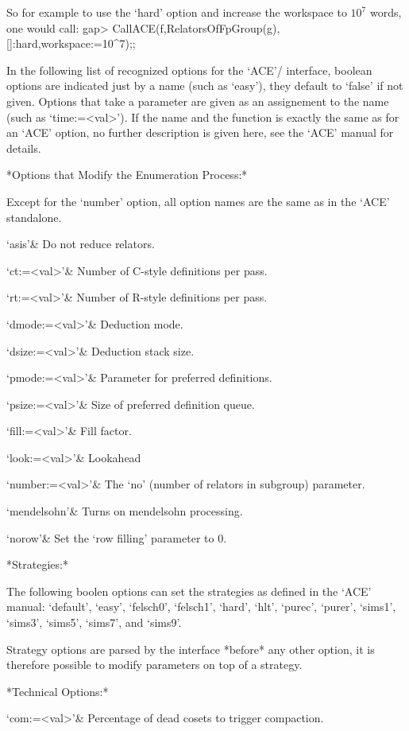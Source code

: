 So for example to use the `hard' option and increase the workspace to $10^7$
words, one would call:
\begintt
gap> CallACE(f,RelatorsOfFpGroup(g),[]:hard,workspace:=10^7);;
\endtt

In the following list of recognized options for
the `ACE'/{\GAP} interface, boolean options are indicated just by a name
(such as `easy'), they default to `false' if not given. Options that take a
parameter are given as an assignement to the name (such as `time:=<val>').
If the name and the function is exactly the same as for an `ACE' option, no
further description is given here, see the `ACE' manual for details.

*Options that Modify the Enumeration Process:*

Except for the `number' option, all option names are the same as in the
`ACE' standalone.

\beginitems
`asis'&
Do not reduce relators.

`ct:=<val>'&
Number of C-style definitions per pass.

`rt:=<val>'&
Number of R-style definitions per pass.

`dmode:=<val>'&
Deduction mode.

`dsize:=<val>'&
Deduction stack size.

`pmode:=<val>'&
Parameter for preferred definitions.

`psize:=<val>'&
Size of preferred definition queue.

`fill:=<val>'&
Fill factor.

`look:=<val>'&
Lookahead

`number:=<val>'&
The `no' (number of relators in subgroup) parameter.

`mendelsohn'&
Turns on mendelsohn processing.

`norow'&
Set the `row filling' parameter to 0.

\enditems

*Strategies:*

The following boolen options can set the strategies as defined in the  `ACE'
manual: `default', `easy', `felsch0', `felsch1', `hard', `hlt', `purec',
`purer', `sims1', `sims3', `sims5', `sims7', and `sims9'.

Strategy options are parsed by the interface *before* any other option, it
is therefore possible to modify parameters on top of a strategy.

*Technical Options:*

\beginitems
`com:=<val>'&
Percentage of dead cosets to trigger compaction.

